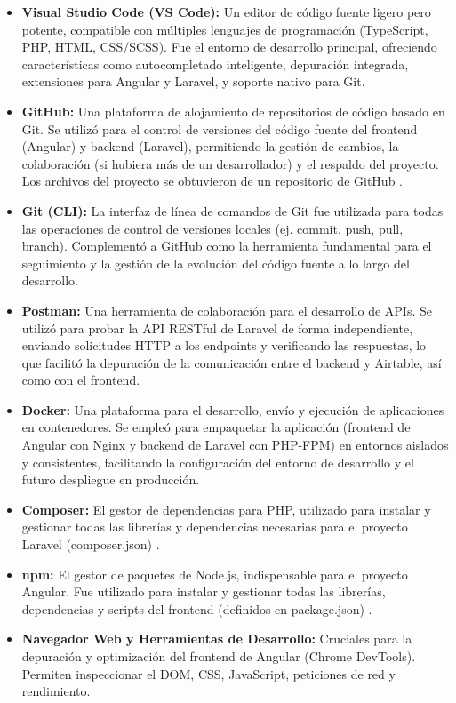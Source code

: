 \begin{enumerate}
    \begin{itemize}
        \item \textbf{Visual Studio Code (VS Code):} Un editor de código fuente ligero pero potente, compatible con múltiples lenguajes de programación (TypeScript, PHP, HTML, CSS/SCSS). Fue el entorno de desarrollo principal, ofreciendo características como autocompletado inteligente, depuración integrada, extensiones para Angular y Laravel, y soporte nativo para Git.
        \item \textbf{GitHub:} Una plataforma de alojamiento de repositorios de código basado en Git. Se utilizó para el control de versiones del código fuente del frontend (Angular) y backend (Laravel), permitiendo la gestión de cambios, la colaboración (si hubiera más de un desarrollador) y el respaldo del proyecto. Los archivos del proyecto se obtuvieron de un repositorio de GitHub \cite{github2024docs}.
        \item \textbf{Git (CLI):} La interfaz de línea de comandos de Git fue utilizada para todas las operaciones de control de versiones locales (ej. commit, push, pull, branch). Complementó a GitHub como la herramienta fundamental para el seguimiento y la gestión de la evolución del código fuente a lo largo del desarrollo.
        \item \textbf{Postman:} Una herramienta de colaboración para el desarrollo de APIs. Se utilizó para probar la API RESTful de Laravel de forma independiente, enviando solicitudes HTTP a los endpoints y verificando las respuestas, lo que facilitó la depuración de la comunicación entre el backend y Airtable, así como con el frontend.
        \item \textbf{Docker:} Una plataforma para el desarrollo, envío y ejecución de aplicaciones en contenedores. Se empleó para empaquetar la aplicación (frontend de Angular con Nginx y backend de Laravel con PHP-FPM) en entornos aislados y consistentes, facilitando la configuración del entorno de desarrollo y el futuro despliegue en producción.
        \item \textbf{Composer:} El gestor de dependencias para PHP, utilizado para instalar y gestionar todas las librerías y dependencias necesarias para el proyecto Laravel (composer.json) \cite{composer2024docs}.
        \item \textbf{npm:} El gestor de paquetes de Node.js, indispensable para el proyecto Angular. Fue utilizado para instalar y gestionar todas las librerías, dependencias y scripts del frontend (definidos en package.json) \cite{npm2024docs}.
        \item \textbf{Navegador Web y Herramientas de Desarrollo:} Cruciales para la depuración y optimización del frontend de Angular (Chrome DevTools). Permiten inspeccionar el DOM, CSS, JavaScript, peticiones de red y rendimiento.
    \end{itemize}


\end{enumerate}
